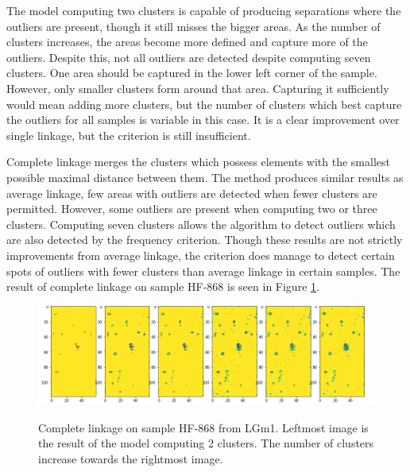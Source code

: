 The model computing two clusters is capable of producing separations where the outliers are present, though it still misses the bigger areas. As the number of clusters increases, the areas become more defined and capture more of the outliers. Despite this, not all outliers are detected despite computing seven clusters. One area should be captured in the lower left corner of the sample. However, only smaller clusters form around that area. Capturing it sufficiently would mean adding more clusters, but the number of clusters which best capture the outliers for all samples is variable in this case. It is a clear improvement over single linkage, but the criterion is still insufficient.

Complete linkage merges the clusters which possess elements with the smallest possible maximal distance between them. The method produces similar results as average linkage, few areas with outliers are detected when fewer clusters are permitted. However, some outliers are present when computing two or three clusters. Computing seven clusters allows the algorithm to detect outliers which are also detected by the frequency criterion. Though these results are not strictly improvements from average linkage, the criterion does manage to detect certain spots of outliers with fewer clusters than average linkage in certain samples. The result of complete linkage on sample HF-868 is seen in Figure \ref{fig:CL_HF868}.

\begin{figure}[H]

    \centering
{\includegraphics[width=13cm]{images/Complete_linkage/LGm-1/HF-868_1_2.h5_0.png} }
\caption{Complete linkage on sample HF-868 from LGm1. Leftmost image is the result of the model computing 2 clusters. The number of clusters increase towards the rightmost image.\label{fig:CL_HF868}}%

\end{figure}

